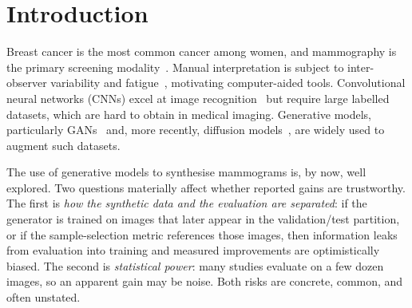 \documentclass[runningheads]{llncs}
\begin{document}
\section{Introduction}
Breast cancer is the most common cancer among women, and mammography is the
primary screening modality~\cite{precoce2004controle,azevedo2016importancia}.
Manual interpretation is subject to inter-observer variability and
fatigue~\cite{obuchowicz2020interobserver}, motivating computer-aided
tools. Convolutional neural networks (CNNs) excel at image
recognition~\cite{lecun2015deep,mendel2019transfer} but require large labelled
datasets, which are hard to obtain in medical imaging. Generative models,
particularly GANs~\cite{goodfellow2014gan} and, more recently, diffusion
models~\cite{rombach2022ldm}, are widely used to augment such datasets.

The use of generative models to synthesise mammograms is, by now, well explored.
Two questions materially affect whether reported gains are trustworthy. The
first is \emph{how the synthetic data and the evaluation are separated}: if the
generator is trained on images that later appear in the validation/test
partition, or if the sample-selection metric references those images, then
information leaks from evaluation into training and measured improvements are
optimistically biased. The second is \emph{statistical power}: many studies
evaluate on a few dozen images, so an apparent gain may be noise. Both risks are
concrete, common, and often unstated.
\end{document}
